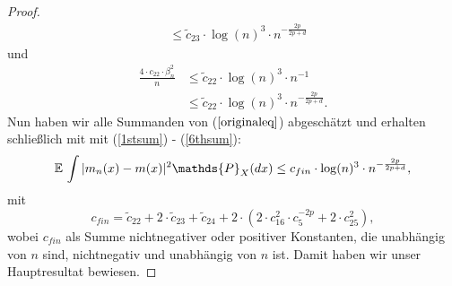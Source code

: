\begin{proof}
\begin{equation}
\begin{split}
& \leq \tilde{c}_{23} \cdot \log(n)^3 \cdot n^{- \frac{2p}{2p + d}} 
\end{split}
\end{equation} 
und 
\begin{equation}
\label{6thsum}
\begin{split}
\frac{4 \cdot c_{22} \cdot \beta_n^2}{n} & \leq \tilde{c}_{22} \cdot \log(n)^3 \cdot n^{-1} \\
& \leq \tilde{c}_{22} \cdot \log(n)^3 \cdot n^{- \frac{2p}{2p + d}}.  
\end{split}
\end{equation} 
Nun haben wir alle Summanden von ($\ref{originaleq}$) abgeschätzt und erhalten schließlich mit mit (\ref{1stsum}) - (\ref{6thsum}):
\begin{equation*}
\E \int |m_n(x) - m(x)|^2 \mathds{P}_X(dx) \leq c_{fin} \cdot \log(n)^3 \cdot n^{- \frac{2p}{2p + d}},
\end{equation*}
mit 
$$c_{fin} = \tilde{c}_{22} + 2 \cdot \tilde{c}_{23} + \tilde{c}_{24} + 2 \cdot (2 \cdot c_{16}^2 \cdot c_{5}^{-2p} + 2 \cdot  c_{25}^2),$$
wobei $c_{fin}$ als Summe nichtnegativer oder positiver Konstanten, die unabhängig von $n$ sind, nichtnegativ und unabhängig von $n$ ist.
Damit haben wir unser Hauptresultat bewiesen.
\end{proof}